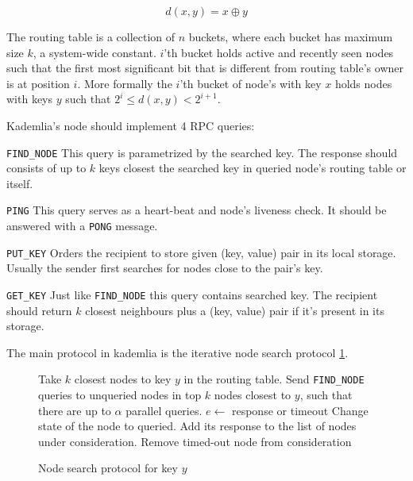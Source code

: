   \[ d(x, y) = x \oplus y\]

  The routing table is a collection of $n$ buckets, where each bucket has
  maximum size $k$, a system-wide constant. 
  $i$'th bucket holds active and recently seen nodes such that the first most
  significant bit that is different from routing table's owner is at position
  $i$. More formally the $i$'th bucket of node's with key $x$ holds nodes with
  keys $y$ such that $2^i \leq d(x, y) < 2^{i+1}$.

  Kademlia's node should implement 4 RPC queries:

  \begin{description}
    \item{\verb|FIND_NODE|} This query is parametrized by the searched key. The
      response should consists of up to $k$ keys closest the searched key in
      queried node's routing table or itself.
    \item{\verb|PING|} This query serves as a heart-beat and node's liveness
      check. It should be answered with a \verb|PONG| message.
    \item{\verb|PUT_KEY|} Orders the recipient to store given (key, value) pair
      in its local storage. Usually the sender first searches for nodes close
      to the pair's key.
    \item{\verb|GET_KEY|} Just like \verb|FIND_NODE| this query contains
      searched key. The recipient should return $k$ closest neighbours plus a
      (key, value) pair if it's present in its storage.
  \end{description}

  The main protocol in kademlia is the iterative node search protocol
  \ref{fig:node_search_alg}.

  \begin{figure}
    \label{fig:node_search_alg}
    \begin{algorithmic}[1]
    \STATE Take $k$ closest nodes to key $y$ in the routing table.
    \STATE Send \verb|FIND_NODE| queries to unqueried nodes in top $k$ 
    nodes closest to $y$, such that there are up to $\alpha$ parallel queries.
    \STATE $e \leftarrow$ response or timeout
      \STATE Change state of the node to queried. Add its response to the list
      of
      nodes under consideration.
    \ELSE
      \STATE Remove timed-out node from consideration
    \ENDIF
    \ENDWHILE
  \end{algorithmic}
    \caption{Node search protocol for key $y$}
  \end{figure}

